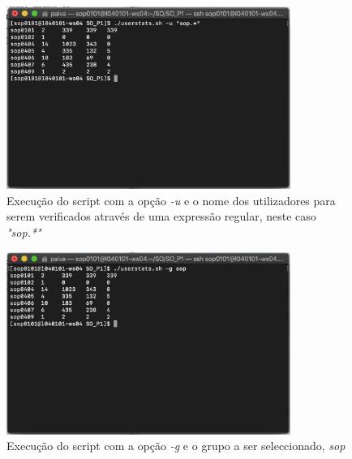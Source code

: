 \documentclass[10pt,portuguese]{article}
\begin{document}
\begin{figure}[!h]
    \centering
    \includegraphics[width=350]{Resultados/-u.png}
    \caption{Execução do script com a opção \textit{-u} e o nome dos utilizadores para serem verificados através de uma expressão regular, neste caso \textit{"sop.*"}}
\end{figure}

\begin{figure}[!h]
    \centering
    \includegraphics[width=350]{Resultados/-g.png}
    \caption{Execução do script com a opção \textit{-g} e o grupo a ser seleccionado, \textit{sop}}
\end{figure}
\end{document}

